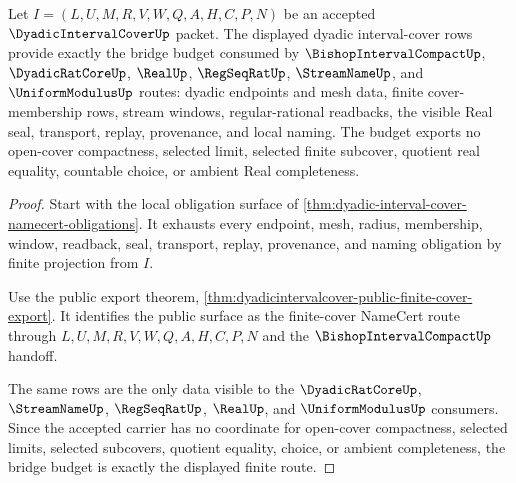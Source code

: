 \begin{theorem}
\label{thm:dyadic-interval-cover-bridge-budget}
Let $I=(L,U,M,R,V,W,Q,A,H,C,P,N)$ be an accepted $\DyadicIntervalCoverUp$ packet. The displayed dyadic interval-cover rows provide exactly the bridge budget consumed by $\BishopIntervalCompactUp$, $\DyadicRatCoreUp$, $\RealUp$, $\RegSeqRatUp$, $\StreamNameUp$, and $\UniformModulusUp$ routes: dyadic endpoints and mesh data, finite cover-membership rows, stream windows, regular-rational readbacks, the visible Real seal, transport, replay, provenance, and local naming. The budget exports no open-cover compactness, selected limit, selected finite subcover, quotient real equality, countable choice, or ambient Real completeness.
\end{theorem}
\begin{proof}
Start with the local obligation surface of \autoref{thm:dyadic-interval-cover-namecert-obligations}. It exhausts every endpoint, mesh, radius, membership, window, readback, seal, transport, replay, provenance, and naming obligation by finite projection from $I$.

Use the public export theorem, \autoref{thm:dyadicintervalcover-public-finite-cover-export}. It identifies the public surface as the finite-cover NameCert route through $L,U,M,R,V,W,Q,A,H,C,P,N$ and the $\BishopIntervalCompactUp$ handoff.

The same rows are the only data visible to the $\DyadicRatCoreUp$, $\StreamNameUp$, $\RegSeqRatUp$, $\RealUp$, and $\UniformModulusUp$ consumers. Since the accepted carrier has no coordinate for open-cover compactness, selected limits, selected subcovers, quotient equality, choice, or ambient completeness, the bridge budget is exactly the displayed finite route.
\end{proof}

